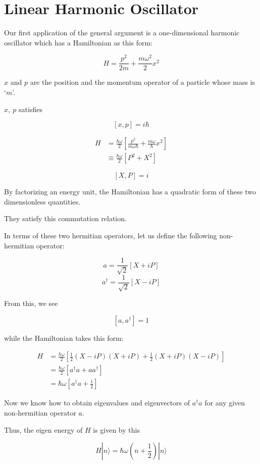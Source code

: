 \section{Linear Harmonic Oscillator}


Our first application of the general argument is a one-dimensional harmonic oscillator which has a Hamiltonian as this form:

\begin{equation}
H = \frac{p^2}{2m}+\frac{m\omega^2}{2}x^2
\end{equation}

$x$ and $p$ are the position and the momentum operator of a particle whose mass is `$m$'.

$x,\ p$ satisfies

\[[x, p] = i\hbar \]

\[\begin{split}
H &= \frac{\hbar\omega}{2}\left[\frac{p^2}{m\omega\hbar}+\frac{m\omega}{\hbar}x^2\right]\\
&\equiv\frac{\hbar\omega}{2}[P^2+X^2]
\end{split} \]

\[[X, P] = i \]

By factorizing an energy unit, the Hamiltonian has a quadratic form of these two dimensionless quantities. 

They satisfy this commutation relation. 

In terms of these two hermitian operators, let us define the following non-hermitian operator:

\[a = \frac{1}{\sqrt{2}}[X+iP] \]
\[a^\dagger = \frac{1}{\sqrt{2}}[X-iP] \]

From this, we see

\[[a,a^\dagger] = 1 \]

while the Hamiltonian takes this form:

\[\begin{split}
H &= \frac{\hbar\omega}{2}\left[\frac{1}{2}(X-iP)(X+iP)+\frac{1}{2}(X+iP)(X-iP)\right]\\
&=\frac{\hbar\omega}{2}[a^\dagger a+a a^\dagger]\\
&=\hbar\omega\left[a^\dagger a+\frac{1}{2}\right]
\end{split} \]

Now we know how to obtain eigenvalues and eigenvectors of $a^\dagger a$ for any given non-hermitian operator $a$. 

Thus, the eigen energy of $H$ is given by this

\[H|n\rangle = \hbar\omega\left(n+\frac{1}{2}\right)|n\rangle \]

